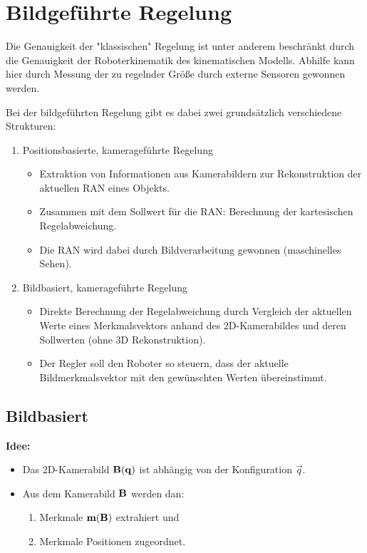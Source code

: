 	\section{Bildgeführte Regelung}
		Die Genauigkeit der "klassischen" Regelung ist unter anderem beschränkt durch die Genauigkeit der Roboterkinematik \bzw des kinematischen Modells. Abhilfe kann hier durch Messung der zu regelnder Größe durch externe Sensoren gewonnen werden.
		
		Bei der bildgeführten Regelung gibt es dabei zwei grundsätzlich verschiedene Strukturen:
		\begin{enumerate}
			\item Positionsbasierte, kamerageführte Regelung
				\begin{itemize}
					\item Extraktion von Informationen aus Kamerabildern zur Rekonstruktion der aktuellen RAN eines Objekts.
					\item Zusammen mit dem Sollwert für die RAN: Berechnung der kartesischen Regelabweichung.
					\item Die RAN wird dabei \bspw durch Bildverarbeitung gewonnen (maschinelles Sehen).
				\end{itemize}
			\item Bildbasiert, kamerageführte Regelung
				\begin{itemize}
					\item Direkte Berechnung der Regelabweichung durch Vergleich der aktuellen Werte eines Merkmalsvektors anhand des 2D-Kamerabildes und deren Sollwerten (ohne 3D Rekonstruktion).
					\item Der Regler soll den Roboter so steuern, dass der aktuelle Bildmerkmalsvektor mit den gewünschten Werten übereinstimmt.
				\end{itemize}
		\end{enumerate}

		\subsection{Bildbasiert}
			\textbf{Idee:}
			\begin{itemize}
				\item Das 2D-Kamerabild \( \boldsymbol{\mathrm{B}}(\boldsymbol{\mathrm{q}}) \) ist abhängig von der Konfiguration \( \vec{q} \).
				\item Aus dem Kamerabild \( \boldsymbol{\mathrm{B}} \) werden dan:
					\begin{enumerate}
						\item Merkmale \( \boldsymbol{\mathrm{m}}(\boldsymbol{\mathrm{B}}) \) extrahiert und
						\item Merkmale Positionen zugeordnet.
					\end{enumerate}
			\end{itemize}
		
